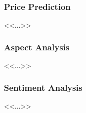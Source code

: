 \subsubsection{Price Prediction}
<<...>>

\subsubsection{Aspect Analysis}
<<...>>

\subsubsection{Sentiment Analysis}
<<...>>